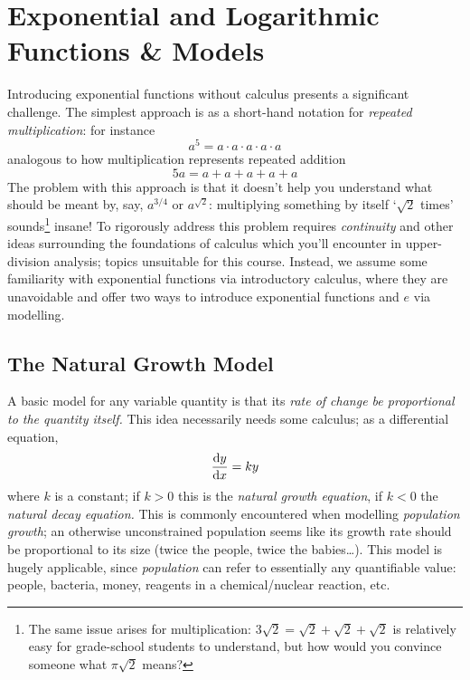 
\graphicspath{{3exp/asy/}}

\section{Exponential and Logarithmic Functions \& Models}

Introducing exponential functions without calculus presents a significant challenge. The simplest approach is as a short-hand notation for \emph{repeated multiplication}: for instance
\[
	a^5=a\cdot a\cdot a\cdot a\cdot a
\]
analogous to how multiplication represents repeated addition
\[
	5a=a+a+a+a+a
\]
The problem with this approach is that it doesn't help you understand what should be meant by, say, $a^{3/4}$ or $a^{\sqrt 2}$: multiplying something by itself `$\sqrt 2$ times' sounds\footnote{The same issue arises for multiplication: $3\sqrt 2=\sqrt 2+\sqrt 2+\sqrt 2$ is relatively easy for grade-school students to understand, but how would you convince someone what $\pi\sqrt 2$ means?} insane!\smallbreak
To rigorously address this problem requires \emph{continuity} and other ideas surrounding the foundations of calculus which you'll encounter in upper-division analysis; topics unsuitable for this course. Instead, we assume some familiarity with exponential functions via introductory calculus, where they are unavoidable and offer two ways to introduce exponential functions and $e$ via modelling.


\subsection{The Natural Growth Model}

A basic model for any variable quantity is that its \emph{rate of change be proportional to the quantity itself.} This idea necessarily needs some calculus; as a differential equation,
\[
	\diff[y]{x}=ky
\]
where $k$ is a constant; if $k>0$ this is the \emph{natural growth equation}, if $k<0$ the \emph{natural decay equation.} This is commonly encountered when modelling \emph{population growth}; an otherwise unconstrained population seems like its growth rate should be proportional to its size (twice the people, twice the babies\ldots). This model is hugely applicable, since \emph{population} can refer to essentially any quantifiable value: people, bacteria, money, reagents in a chemical/nuclear reaction, etc.\medbreak
% 

